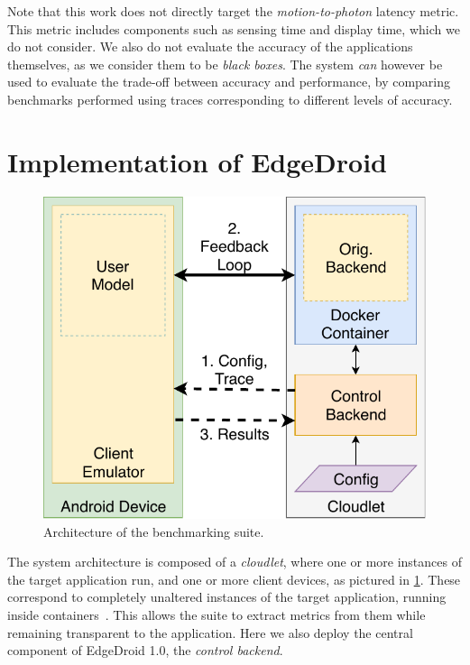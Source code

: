 Note that this work does not directly target the \emph{motion-to-photon} latency metric.
This metric includes components such as sensing time and display time, which we do not consider.
We also do not evaluate the accuracy of the applications themselves, as we consider them to be \emph{black boxes}.
The system \emph{can} however be used to evaluate the trade-off between accuracy and performance, by comparing benchmarks performed using traces corresponding to different levels of accuracy.


\section{Implementation of EdgeDroid}\label{sec:implementation}

\begin{figure}[tb]
    \centering
    \includegraphics[width=.7\columnwidth]{img/TraceReplay_GenArch}
    \caption{Architecture of the benchmarking suite.}\label{fig:TraceReplayArch}
\end{figure}


The system architecture is composed of a \emph{cloudlet}, where one or more instances of the target application run, and one or more client devices, as pictured in \cref{fig:TraceReplayArch}.
These correspond to completely unaltered instances of the target application, running inside containers~\cite{docker}.
This allows the suite to extract metrics from them while remaining transparent to the application.
Here we also deploy the central component of EdgeDroid 1.0, the \emph{control backend}.

